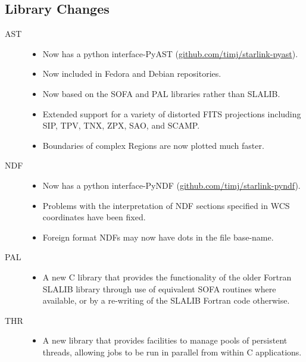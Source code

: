 \documentclass[11pt,twoside]{article}
\begin{document}
\subsection{Library Changes}
\begin{description}

\item[AST] \hfill
\begin{itemize}
\item Now has a python interface-PyAST (\url{github.com/timj/starlink-pyast}).
\item Now included in Fedora and Debian repositories.
\item Now based on the SOFA and PAL libraries rather than SLALIB.
\item Extended support for a variety of distorted FITS projections including SIP, TPV, TNX, ZPX, SAO, and SCAMP.
\item Boundaries of complex Regions are now plotted much faster.
\end{itemize}

\item[NDF] \hfill
\begin{itemize}
\item Now has a python interface-PyNDF (\url{github.com/timj/starlink-pyndf}).
\item Problems with the interpretation of NDF sections specified in WCS coordinates have been fixed.
\item Foreign format NDFs may now have dots in the file base-name.
\end{itemize}

\item[PAL] \hfill
\begin{itemize}
\item A new C library that provides the functionality of the older Fortran SLALIB library through use of equivalent SOFA routines where available, or by a re-writing of the SLALIB Fortran code otherwise.
\end{itemize}

\item[THR] \hfill
\begin{itemize}
\item A new library that provides facilities to manage pools of persistent threads, allowing jobs to be run in parallel from within C applications.
\end{itemize}

\end{description}
\end{document}
